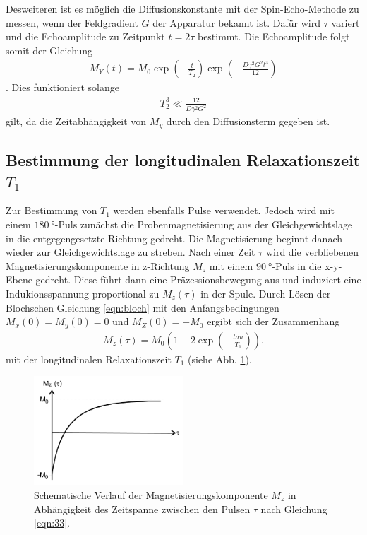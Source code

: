 Desweiteren ist es möglich die
Diffusionskonstante mit der Spin-Echo-Methode
zu messen, wenn der Feldgradient $G$ der Apparatur bekannt ist.
Dafür wird $\tau$ variert und die Echoamplitude zu Zeitpunkt $t=2\tau$ bestimmt.
Die Echoamplitude folgt somit der Gleichung
\begin{align}
M_Y(t) = M_0\exp\left(-\frac{t}{T_2}\right)
\exp\left(-\frac{D\gamma^2 G^2 t^3}{12}\right) \label{eqn:32}
\end{align}.
Dies funktioniert solange
\begin{align}
  T_2^3 \ll \frac{12}{D\gamma^2 G^2}
\end{align}
gilt, da die Zeitabhängigkeit von $M_y$ durch den Diffusionsterm gegeben ist.
\subsection{Bestimmung der longitudinalen Relaxationszeit $T_1$}
Zur Bestimmung von $T_1$ werden ebenfalls Pulse verwendet.
Jedoch wird mit einem $\SI{180}{\degree}$-Puls zunächst die Probenmagnetisierung
aus der Gleichgewichtslage in die entgegengesetzte
Richtung gedreht. Die Magnetisierung beginnt danach
wieder zur Gleichgewichtslage zu streben.
Nach einer Zeit $\tau$ wird
die verbliebenen Magnetisierungskomponente in z-Richtung $M_z$
mit einem $\SI{90}{\degree}$-Puls in die x-y-Ebene gedreht.
Diese führt dann eine Präzessionsbewegung aus und induziert eine
Indukionsspannung proportional zu $M_z(\tau)$ in der Spule.
Durch Lösen der Blochschen Gleichung \eqref{eqn:bloch}
mit den Anfangsbedingungen $M_x(0)=M_y(0)=0$ und $M_Z(0)=-M_0$
ergibt sich der Zusammenhang
\begin{align}
  M_z(\tau) = M_0 \left(1 - 2 \exp\left(-\frac{tau}{T_1}\right)\right). \label{eqn:33}
\end{align}
mit der longitudinalen Relaxationszeit $T_1$ (siehe Abb. \ref{fig:M_z}).

\begin{figure}
  \centering
  \includegraphics[width=0.5\textwidth]{M_z.PNG}
  \caption{Schematische Verlauf der Magnetisierungskomponente $M_z$
    in Abhängigkeit des Zeitspanne zwischen den Pulsen $\tau$ nach Gleichung \eqref{eqn:33}.\cite{sample}}
  \label{fig:M_z}
\end{figure}

%
